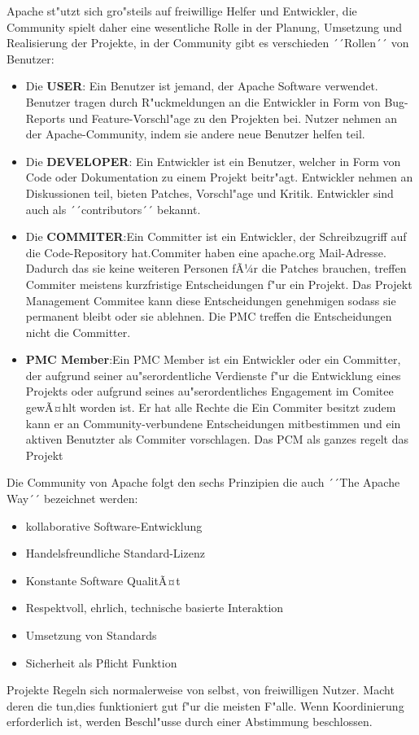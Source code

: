 Apache st"utzt sich gro"steils auf  freiwillige Helfer und Entwickler, die Community spielt daher eine wesentliche Rolle in der Planung, Umsetzung und Realisierung der Projekte, in der Community gibt es verschieden ´´Rollen´´ von Benutzer:
\begin{itemize}
\item{Die \textbf{USER}: Ein Benutzer ist jemand, der Apache Software verwendet. Benutzer tragen durch R"uckmeldungen an die Entwickler in Form von Bug-Reports und Feature-Vorschl"age zu den Projekten bei. Nutzer nehmen an der Apache-Community, indem sie andere neue Benutzer helfen teil.}
\item{Die \textbf{DEVELOPER}: Ein Entwickler ist ein Benutzer, welcher in Form von Code oder Dokumentation zu einem Projekt beitr"agt. Entwickler nehmen an Diskussionen teil, bieten Patches, Vorschl"age und Kritik. Entwickler sind auch als  ´´contributors´´ bekannt.}
\item{Die \textbf{COMMITER}:Ein Committer ist ein Entwickler, der Schreibzugriff auf die Code-Repository hat.Commiter haben eine apache.org Mail-Adresse. Dadurch das sie keine weiteren Personen fÃ¼r die Patches brauchen, treffen Commiter meistens kurzfristige Entscheidungen f"ur ein Projekt. Das Projekt Management Commitee kann diese Entscheidungen genehmigen sodass sie permanent bleibt oder sie ablehnen. Die PMC treffen die Entscheidungen nicht die Committer.}
\item{\textbf{PMC Member}:Ein PMC Member ist ein Entwickler oder ein Committer, der aufgrund seiner au"serordentliche Verdienste f"ur die Entwicklung eines Projekts oder aufgrund seines au"serordentliches  Engagement im Comitee gewÃ¤hlt worden ist. Er hat alle Rechte die Ein Commiter besitzt zudem kann er an Community-verbundene Entscheidungen mitbestimmen und ein aktiven Benutzter als Commiter vorschlagen. Das PCM als ganzes regelt das Projekt }
\end{itemize}
\newpage
Die Community von Apache folgt den sechs Prinzipien die auch ´´The Apache Way´´ bezeichnet werden:
\begin{itemize}
\item{kollaborative Software-Entwicklung}
\item{Handelsfreundliche Standard-Lizenz}
\item{Konstante Software QualitÃ¤t}
\item{Respektvoll, ehrlich, technische basierte Interaktion}
\item{Umsetzung von Standards}
\item{Sicherheit als Pflicht Funktion}
\end{itemize}
Projekte Regeln sich normalerweise von selbst, von freiwilligen Nutzer. Macht deren die tun,dies funktioniert gut f"ur die meisten F"alle. Wenn Koordinierung erforderlich ist, werden Beschl"usse durch einer Abstimmung beschlossen.

